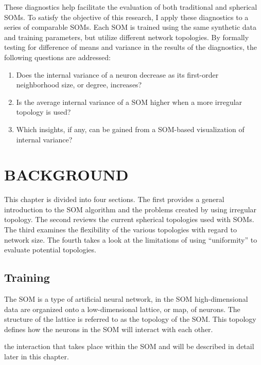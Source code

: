 These diagnostics help facilitate the evaluation of both traditional and
spherical SOMs.  To satisfy the objective of this research, I apply these
diagnostics to a series of comparable SOMs.  Each SOM is trained using the
same synthetic data and training parameters, but utilize different network
topologies.  By formally testing for difference of means and variance in the
results of the diagnostics, the following questions are addressed:

\begin{enumerate}
	\item Does the internal variance of a neuron decrease as its first-order neighborhood size, or degree, increases?
	\item Is the average internal variance of a SOM higher when a more irregular topology is used?
	\item Which insights, if any, can be gained from a SOM-based visualization of internal variance?
\end{enumerate}



\chapter{BACKGROUND}
This chapter is divided into four sections.  The first provides a general
introduction to the SOM algorithm and the problems created by using irregular
topology. The second reviews the current spherical topologies used with SOMs.
The third examines the flexibility of the various topologies with regard to
network size. The fourth takes a look at the limitations of using ``uniformity''
to evaluate potential topologies.

\section{Training}
The SOM is a type of artificial neural network, in the SOM high-dimensional
data are organized onto a low-dimensional lattice, or map, of neurons.  The
structure of the lattice is referred to as the topology of the SOM.  This
topology defines how the neurons in the SOM will interact with each other.


 the interaction that takes place within the SOM and will
be described in detail later in this chapter.  

